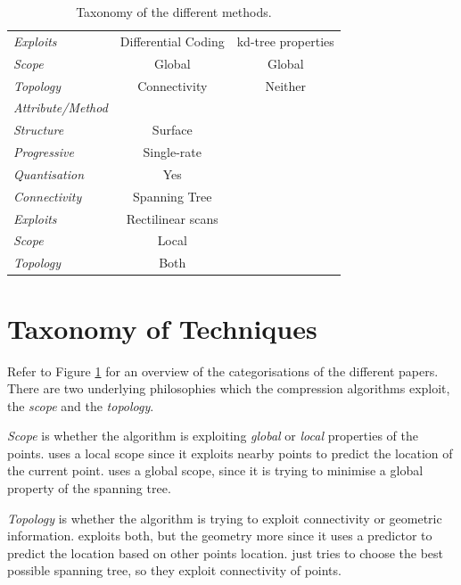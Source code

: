 \documentclass{report}
\begin{document}
\begin{table}[t]
{\begin{tabular}{||l|c|c||}
  \emph{Exploits} & Differential Coding & kd-tree properties \\

  \emph{Scope} & Global & Global \\

  \emph{Topology} & Connectivity & Neither \\

  \hline
  \hline

  \emph{Attribute/Method} & \citep{merrycomp} & \\

  \hline

  \emph{Structure} & Surface & \\

  \emph{Progressive} & Single-rate & \\

  \emph{Quantisation} & Yes & \\

  \emph{Connectivity} & Spanning Tree & \\

  \emph{Exploits} & Rectilinear scans & \\

  \emph{Scope} & Local & \\

  \emph{Topology} & Both & \\

  \hline
\end{tabular}
}
\caption{Taxonomy of the different methods.}\label{tab:taxonomy}
\end{table}


\section{Taxonomy of Techniques}

Refer to Figure \ref{tab:taxonomy} for an overview of the categorisations of
the different papers. There are two underlying philosophies which the
compression algorithms exploit, the \emph{scope} and the \emph{topology}.

\emph{Scope} is whether the algorithm is exploiting \emph{global} or
\emph{local} properties of the points. \citep{merrycomp} uses a local scope
since it exploits nearby points to predict the location of the current
point. \citep{chen2005lcp} uses a global scope, since it is trying to minimise
a global property of the spanning tree.

\emph{Topology} is whether the algorithm is trying to exploit connectivity or
geometric information. \citep{gumholdcomp} exploits both, but the geometry
more since it uses a predictor to predict the location based on other points
location. \citep{chen2005lcp} just tries to choose the best possible spanning
tree, so they exploit connectivity of points.
\end{document}
